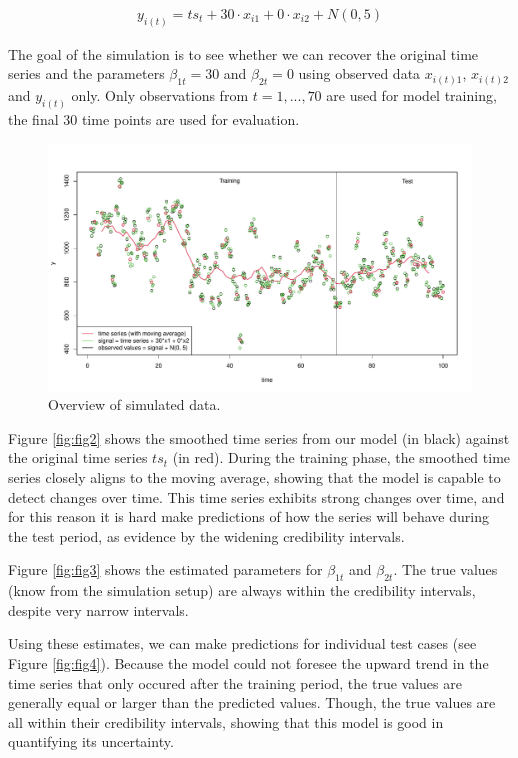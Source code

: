 \documentclass{article}
\begin{document}
\begin{align}
y_{i(t)} = ts_t + 30 \cdot x_{i1} + 0 \cdot x_{i2} + N(0, 5)    
\end{align}

The goal of the simulation is to see whether we can recover the original time series and the parameters $\beta_{1t} = 30$ and $\beta_{2t} = 0$ using observed data $x_{i(t)1}$, $x_{i(t)2}$ and $y_{i(t)}$ only. Only observations from $t = 1, ..., 70$ are used for model training, the final 30 time points are used for evaluation.

\begin{figure}
	\centering
	\includegraphics[width=630pt, angle=270]{visualize_simulated_data.pdf}
	\caption{Overview of simulated data.}
	\label{fig:fig1}
\end{figure}

Figure \ref{fig:fig2} shows the smoothed time series from our model (in black) against the original time series $ts_t$ (in red). During the training phase, the smoothed time series closely aligns to the moving average, showing that the model is capable to detect changes over time. This time series exhibits strong changes over time, and for this reason it is hard make predictions of how the series will behave during the test period, as evidence by the widening credibility intervals.

Figure \ref{fig:fig3} shows the estimated parameters for $\beta_{1t}$ and $\beta_{2t}$. The true values (know from the simulation setup) are always within the credibility intervals, despite very narrow intervals.

Using these estimates, we can make predictions for individual test cases (see Figure \ref{fig:fig4}). Because the model could not foresee the upward trend in the time series that only occured after the training period, the true values are generally equal or larger than the predicted values. Though, the true values are all within their credibility intervals, showing that this model is good in quantifying its uncertainty.
\end{document}
